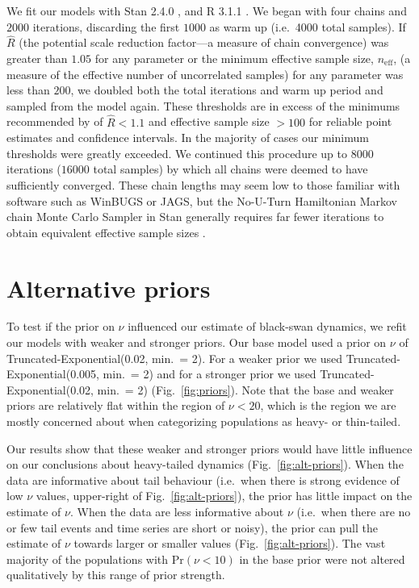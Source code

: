 We fit our models with Stan 2.4.0 \citep{stan-manual2014}, and R 3.1.1
\citep{r2014}. We began with four chains and $2000$ iterations, discarding the
first $1000$ as warm up (i.e.~4000 total samples). If $\hat{R}$ (the potential
scale reduction factor---a measure of chain convergence) was greater than
$1.05$ for any parameter or the minimum effective sample size,
$n_\mathrm{eff}$, (a measure of the effective number of uncorrelated samples)
for any parameter was less than $200$, we doubled both the total iterations
and warm up period and sampled from the model again. These thresholds are in
excess of the minimums recommended by \citet{gelman2006a} of $\hat{R} < 1.1$
and effective sample size $> 100$ for reliable point estimates and confidence
intervals. In the majority of cases our minimum thresholds were greatly
exceeded. We continued this procedure up to $8000$ iterations ($16000$ total
samples) by which all chains were deemed to have sufficiently converged. These
chain lengths may seem low to those familiar with software such as WinBUGS or
JAGS, but the No-U-Turn Hamiltonian Markov chain Monte Carlo Sampler in Stan
generally requires far fewer iterations to obtain equivalent effective sample
sizes \citep{stan-manual2014}.

\section{Alternative priors}

To test if the prior on $\nu$ influenced our estimate of black-swan dynamics,
we refit our models with weaker and stronger priors. Our base model used a
prior on $\nu$ of Truncated-Exponential(0.02, min.\ = 2). For a weaker prior
we used Truncated-Exponential(0.005, min.\ = 2) and for a stronger prior we
used Truncated-Exponential(0.02, min.\ = 2) (Fig.~\ref{fig:priors}). Note that
the base and weaker priors are relatively flat within the region of $\nu <
20$, which is the region we are mostly concerned about when categorizing populations
as heavy- or thin-tailed.

Our results show that these weaker and stronger priors would have little
influence on our conclusions about heavy-tailed dynamics
(Fig.~\ref{fig:alt-priors}). When the data are informative about tail
behaviour (i.e.\ when there is strong evidence of low $\nu$ values,
upper-right of Fig.~\ref{fig:alt-priors}), the prior has little impact on the
estimate of $\nu$. When the data are less informative about $\nu$ (i.e.\ when
there are no or few tail events and time series are short or noisy), the prior
can pull the estimate of $\nu$ towards larger or smaller values
(Fig.~\ref{fig:alt-priors}). The vast majority of the populations with Pr$(\nu
< 10)$ in the base prior were not altered qualitatively by this range of prior
strength.

